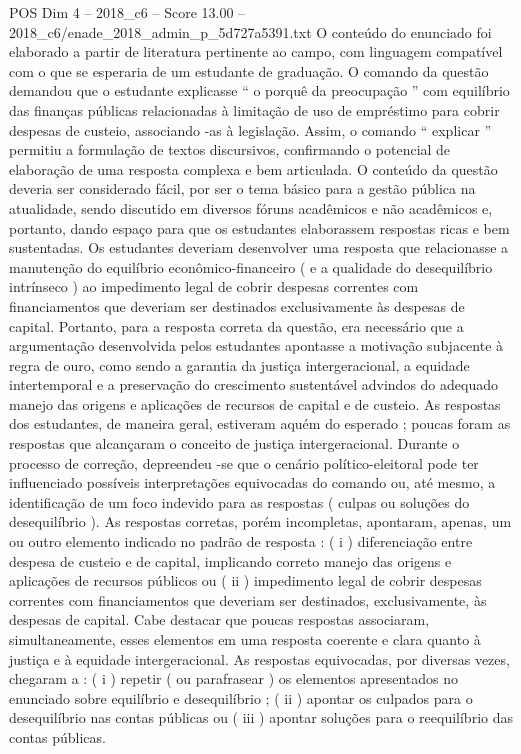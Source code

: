 \begin{textsample}{POS Dim 4 – 2018\_c6 – Score 13.00 – 2018\_c6/enade\_2018\_admin\_p\_5d727a5391.txt}
O conteúdo do enunciado foi elaborado a partir de literatura pertinente ao campo, com linguagem compatível com o que se esperaria de um estudante de graduação.
O comando da questão demandou que o estudante explicasse “ o porquê da preocupação ” com equilíbrio das finanças públicas relacionadas à limitação de uso de empréstimo para cobrir despesas de custeio, associando -as à legislação.
Assim, o comando “ explicar ” permitiu a formulação de textos discursivos, confirmando o potencial de elaboração de uma resposta complexa e bem articulada.
O conteúdo da questão deveria ser considerado fácil, por ser o tema básico para a gestão pública na atualidade, sendo discutido em diversos fóruns acadêmicos e não acadêmicos e, portanto, dando espaço para que os estudantes elaborassem respostas ricas e bem sustentadas.
Os estudantes deveriam desenvolver uma resposta que relacionasse a manutenção do equilíbrio econômico-financeiro ( e a qualidade do desequilíbrio intrínseco ) ao impedimento legal de cobrir despesas correntes com financiamentos que deveriam ser destinados exclusivamente às despesas de capital.
Portanto, para a resposta correta da questão, era necessário que a argumentação desenvolvida pelos estudantes apontasse a motivação subjacente à regra de ouro, como sendo a garantia da justiça intergeracional, a equidade intertemporal e a preservação do crescimento sustentável advindos do adequado manejo das origens e aplicações de recursos de capital e de custeio.
As respostas dos estudantes, de maneira geral, estiveram aquém do esperado ; poucas foram as respostas que alcançaram o conceito de justiça intergeracional.
Durante o processo de correção, depreendeu -se que o cenário político-eleitoral pode ter influenciado possíveis interpretações equivocadas do comando ou, até mesmo, a identificação de um foco indevido para as respostas ( culpas ou soluções do desequilíbrio ).
As respostas corretas, porém incompletas, apontaram, apenas, um ou outro elemento indicado no padrão de resposta : ( i ) diferenciação entre despesa de custeio e de capital, implicando correto manejo das origens e aplicações de recursos públicos ou ( ii ) impedimento legal de cobrir despesas correntes com financiamentos que deveriam ser destinados, exclusivamente, às despesas de capital.
Cabe destacar que poucas respostas associaram, simultaneamente, esses elementos em uma resposta coerente e clara quanto à justiça e à equidade intergeracional.
As respostas equivocadas, por diversas vezes, chegaram a : ( i ) repetir ( ou parafrasear ) os elementos apresentados no enunciado sobre equilíbrio e desequilíbrio ; ( ii ) apontar os culpados para o desequilíbrio nas contas públicas ou ( iii ) apontar soluções para o reequilíbrio das contas públicas.

\end{textsample}
